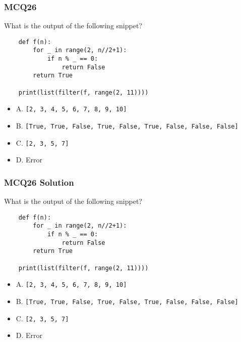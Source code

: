 \documentclass{beamer}
\begin{document}
\begin{frame}[fragile]
    \frametitle{MCQ26}
    What is the output of the following snippet?
    \begin{verbatim}
    def f(n):
        for _ in range(2, n//2+1):
            if n % _ == 0:
                return False
        return True

    print(list(filter(f, range(2, 11))))
    \end{verbatim}
    \begin{itemize}
        \item A. \texttt{[2, 3, 4, 5, 6, 7, 8, 9, 10]}
        \item B. \texttt{[True, True, False, True, False, True, False, False, False]}
        \item C. \texttt{[2, 3, 5, 7]}
        \item D. Error
    \end{itemize}
\end{frame}
\begin{frame}[fragile]
    \frametitle{MCQ26 Solution}
    What is the output of the following snippet?
    \begin{verbatim}
    def f(n):
        for _ in range(2, n//2+1):
            if n % _ == 0:
                return False
        return True

    print(list(filter(f, range(2, 11))))
    \end{verbatim}
    \begin{itemize}
        \item A. \texttt{[2, 3, 4, 5, 6, 7, 8, 9, 10]}
        \item B. \texttt{[True, True, False, True, False, True, False, False, False]}
        \item \alert{C. \texttt{[2, 3, 5, 7]}}
        \item D. Error
    \end{itemize}
\end{frame}
\end{document}

